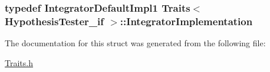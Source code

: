 \subsubsection[{\texorpdfstring{Integrator\+Implementation}{IntegratorImplementation}}]{\setlength{\rightskip}{0pt plus 5cm}typedef {\bf Integrator\+Default\+Impl1} {\bf Traits}$<$ {\bf Hypothesis\+Tester\+\_\+if} $>$\+::{\bf Integrator\+Implementation}}\hypertarget{struct_traits_3_01_hypothesis_tester__if_01_4_aaf49116dcf746abac55182bcdecee2e2}{}\label{struct_traits_3_01_hypothesis_tester__if_01_4_aaf49116dcf746abac55182bcdecee2e2}


The documentation for this struct was generated from the following file\+:\begin{DoxyCompactItemize}
\item 
\hyperlink{_traits_8h}{Traits.\+h}\end{DoxyCompactItemize}
